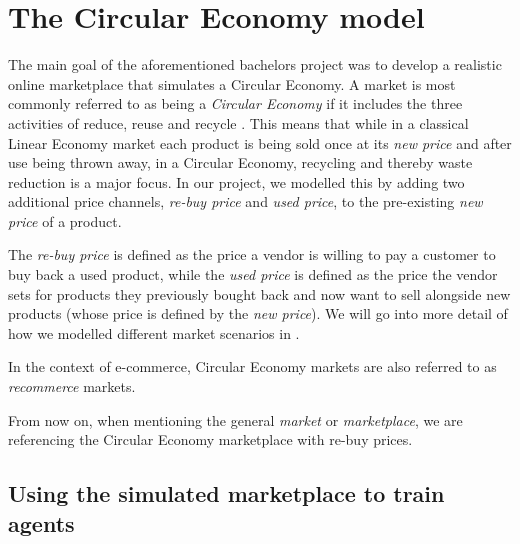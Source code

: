 \section{The Circular Economy model}\label{sec:CircularEconomy}
The main goal of the aforementioned bachelors project was to develop a realistic online marketplace that simulates a Circular Economy. A market is most commonly referred to as being a \emph{Circular Economy} if it includes the three activities of reduce, reuse and recycle \cite{circularEconomyDefinition}. This means that while in a classical Linear Economy market each product is being sold once at its \emph{new price} and after use being thrown away, in a Circular Economy, recycling and thereby waste reduction is a major focus. In our project, we modelled this by adding two additional price channels, \emph{re-buy price} and \emph{used price}, to the pre-existing \emph{new price} of a product.

The \emph{re-buy price} is defined as the price a vendor is willing to pay a customer to buy back a used product, while the \emph{used price} is defined as the price the vendor sets for products they previously bought back and now want to sell alongside new products (whose price is defined by the \emph{new price}). We will go into more detail of how we modelled different market scenarios in .

In the context of e-commerce, Circular Economy markets are also referred to as \emph{recommerce} markets.

From now on, when mentioning the general \emph{market} or \emph{marketplace}, we are referencing the Circular Economy marketplace with re-buy prices.

\subsection*{Using the simulated marketplace to train agents}\label{subsec:ReinforcementLearningIntroduction}

